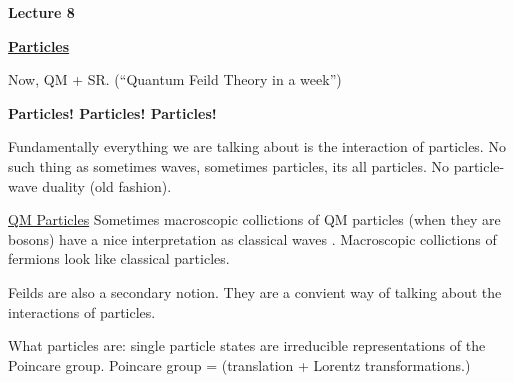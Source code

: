 
\usepackage{fancyhdr}

\fancyhf{}


\thispagestyle{fancy}

\begin{center}
{\huge \textbf{Lecture 8}}
\end{center}

{\fontsize{14}{16}\selectfont

\textbf{\underline{Particles}} 

Now, QM + SR.  (``Quantum Feild Theory in a week'')

\begin{center}
\textbf{Particles! Particles! Particles! }
\end{center}


Fundamentally everything we are talking about is the interaction of particles.
No such thing as sometimes waves, sometimes particles, its all particles.
No particle-wave duality (old fashion).

\underline{QM Particles}
Sometimes macroscopic collictions of QM particles (when they are bosons) have a nice interpretation as classical waves .
Macroscopic collictions of fermions look like classical particles.


Feilds are also a secondary notion.
They are a convient way of talking about the interactions of particles.

What particles are:
single particle states are irreducible representations of the Poincare group. 
Poincare group = (translation + Lorentz transformations.)

}
